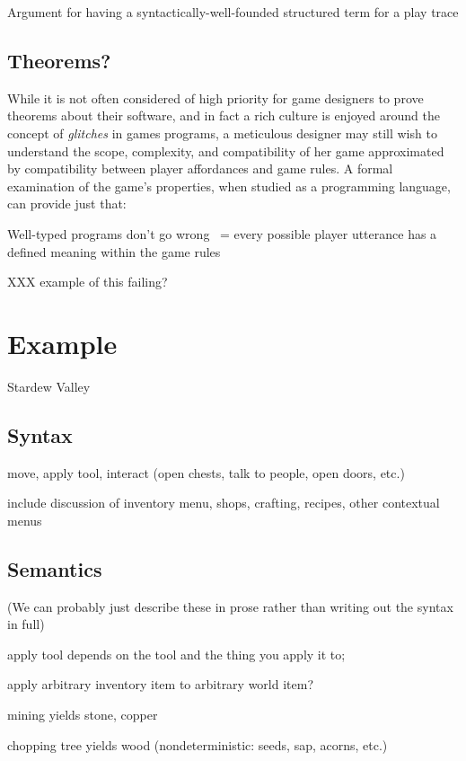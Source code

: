 \documentclass[sigconf]{acmart}
\begin{document}
  Argument for having a syntactically-well-founded structured term for a
  play trace

  \subsection{Theorems?}

  While it is not often considered of high priority for game designers to
  prove theorems about their software, and in fact a rich culture is
  enjoyed around the concept of {\em glitches} in games programs, a
  meticulous designer may still wish to understand the scope, complexity,
  and compatibility of her game approximated by compatibility between 
  player affordances and game rules. A formal examination of the game's
  properties, when studied as a programming language, can provide just
  that:

  Well-typed programs don't go wrong ~= every possible player utterance has
  a defined meaning within the game rules

  XXX example of this failing?
  
\section{Example}

Stardew Valley

\subsection{Syntax}

move, apply tool, interact (open chests, talk to people, open doors, etc.)

include discussion of inventory menu, shops, crafting, recipes, other contextual menus

\subsection{Semantics}

(We can probably just describe these in prose rather than writing out the
syntax in full)

apply tool depends on the tool and the thing you apply it to;

apply arbitrary inventory item to arbitrary world item?

mining yields stone, copper

chopping tree yields wood (nondeterministic: seeds, sap, acorns, etc.)
\end{document}
